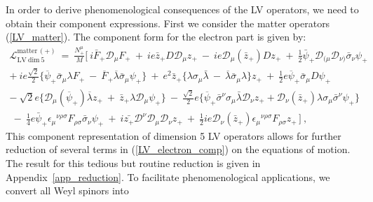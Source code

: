 \documentclass[12pt]{revtex4}
\begin{document}
In order to derive phenomenological consequences of 
the LV operators, we need to obtain their component expressions.
First we consider the matter operators (\ref{LV_matter}).
The component form for the electron part is given by: 
\begin{gather}
\nonumber
  \mathcal{L}_{\mathrm{LV~dim~5}}^{\mathrm{matter\,(+)}} 
~ =~ \frac{N_+^\mu}{M} \Big[~
    i \bar{F}_+ \mathcal{D}_\mu F_+ ~+~
    i e \bar{z}_+ D \mathcal{D}_\mu z_+ ~-~
    i e \mathcal{D}_\mu(\bar{z}_+) D z_+ 
~+~ 
  \frac{1}{2}\bar{\psi}_+\mathcal{D}_{(\mu}\mathcal{D}_{\nu)}
               \bar{\sigma}_\nu \psi_+ 
\nonumber \\
  + ~ 
    i e \frac{\sqrt{2}}{2} \Big\{
               \overline{\psi}_+\bar\sigma_\mu\lambda F_+ 
       ~-~
               \overline{F}_+\overline{\lambda} \bar\sigma_\mu \psi_+
                         \Big\}  ~+~
    e^2 \bar{z}_+ \Big\{
               \lambda\sigma_\mu\bar{\lambda} 
       ~-~
               \overline{\lambda}\bar\sigma_\mu\lambda 
                       \Big\} z_+ 
~+~ 
    \frac{1}{2} e \overline{\psi}_+\bar\sigma_\mu D\psi_+
\nonumber \\
\nonumber
 -~ 
   \sqrt{2} e \Big\{ 
                     \mathcal{D}_\mu(\overline{\psi}_+)\overline{\lambda} z_+ 
     ~+~ 
                     \bar{z}_+ \lambda \mathcal{D}_\mu \psi_+ 
                     \Big\} 
    ~-~ 
    \frac{\sqrt{2}}{2} e \Big\{ 
                      \overline{\psi}_+\bar\sigma^\nu\sigma_\mu 
                     \bar{\lambda}\mathcal{D}_\nu z_+ +
                     \mathcal{D}_\nu(\bar{z}_+)\lambda\sigma_\mu
                     \bar{\sigma}^\nu \psi_+
                     \Big\}
   \\
  ~ -~
  \frac{1}{4} e \bar{\psi}_+\epsilon_\mu{}^{\nu\rho\sigma}
              F_{\rho\sigma} \bar{\sigma}_\nu \psi_+
   ~+~
  i \bar{z_+} \mathcal{D}^\nu \mathcal{D}_\mu \mathcal{D}_\nu z_+ 
   ~+~
   \frac{1}{2} i e \mathcal{D}_\nu (\bar{z}_+) \epsilon_\mu{}^{\nu\rho\sigma}
              F_{\rho\sigma} z_+ \, 
   \Big] ~,
\label{LV_electron_comp}
\end{gather}
%
This component representation  of dimension 5 LV operators allows 
for further
reduction of several terms in (\ref{LV_electron_comp}) on the
equations of motion. The result for this tedious but routine reduction
is given in Appendix~\ref{app_reduction}. To facilitate
phenomenological applications, we convert all Weyl spinors into
\end{document}
